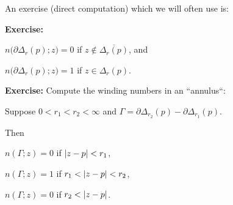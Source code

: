 \documentclass[10pt,aspectratio=169]{beamer}
\begin{document}
\begin{frame}
An exercise (direct computation) which we will often use is:

\medskip
\pause

\textbf{Exercise:}

\medskip

$n\bigl(\partial \Delta_r(p);z\bigr) = 0$ if $z \notin
\overline{\Delta_r(p)}$, and

\medskip
\pause

$n\bigl(\partial \Delta_r(p);z\bigr) = 1$ if $z \in \Delta_r(p)$.

\medskip
\medskip
\pause

\textbf{Exercise:}
Compute the winding numbers in an ``annulus``:

\medskip
\pause

Suppose $0 < r_1 < r_2 < \infty$ and
$\Gamma = \partial \Delta_{r_2}(p) - \partial \Delta_{r_1} (p)$.

\medskip
\pause

Then

\medskip

$n(\Gamma;z) = 0$ if $\lvert {z-p} \rvert < r_1$,

\medskip
\pause

$n(\Gamma;z) = 1$ if $r_1 < \lvert {z-p} \rvert < r_2$,

\medskip
\pause

$n(\Gamma;z) = 0$ if $r_2 < \lvert {z-p} \rvert$.
\end{frame}
\end{document}
